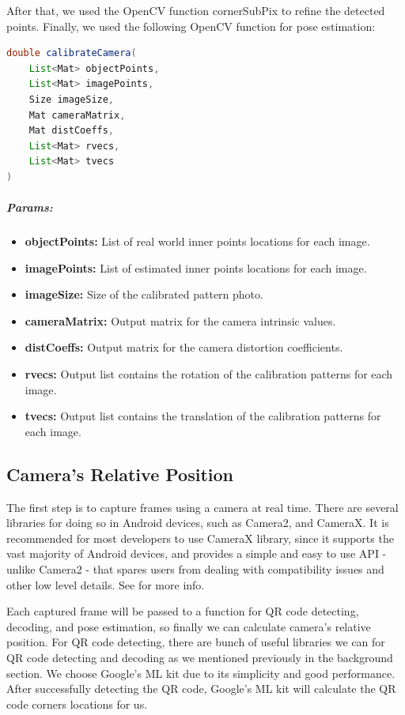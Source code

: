After that, we used the OpenCV function cornerSubPix to refine the detected points. Finally, we used the following OpenCV function for pose estimation:
\begin{lstlisting}[language=Java]
double calibrateCamera(
	List<Mat> objectPoints,
	List<Mat> imagePoints, 
	Size imageSize, 
	Mat cameraMatrix, 
	Mat distCoeffs, 
	List<Mat> rvecs, 
	List<Mat> tvecs
)
\end{lstlisting}

\subparagraph{Params:}

\begin{itemize}
	\item \textbf{objectPoints:}
	List of real world inner points locations for each image.
	\item \textbf{imagePoints:}
	List of estimated inner points locations for each image.
	\item \textbf{imageSize:}
	Size of the calibrated pattern photo.
	\item \textbf{cameraMatrix:}
	Output matrix for the camera intrinsic values.
	\item \textbf{distCoeffs:}
	Output matrix for the camera distortion coefficients.
	\item \textbf{rvecs:}
	Output list contains the rotation of the calibration patterns for each image.
	\item \textbf{tvecs:}
	Output list contains the translation of the calibration patterns for each image.
\end{itemize}

\subsection{Camera's Relative Position}
The first step is to capture frames using a camera at real time. There are several libraries for doing so in Android devices, such as Camera2, and CameraX. It is recommended for most developers to use CameraX library, since it supports the vast majority of Android devices, and provides a simple and easy to use API - unlike Camera2 - that spares users from dealing with compatibility issues and other low level details. See \cite{whichCameraLibToUse} for more info.

Each captured frame will be passed to a function for QR code detecting, decoding, and pose estimation, so finally we can calculate camera's relative position. For QR code detecting, there are bunch of useful libraries we can for QR code detecting and decoding as we mentioned previously in the background section. We choose Google's ML kit due to its simplicity and good performance. After successfully detecting the QR code, Google's ML kit will calculate the QR code corners locations for us.

